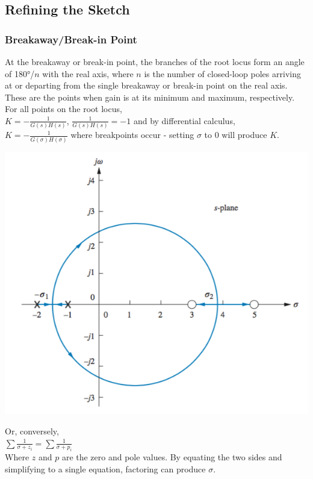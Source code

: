 \documentclass[11pt]{article}
\begin{document}
    \subsection{Refining the Sketch}

    \subsubsection{Breakaway/Break-in Point}

    At the breakaway or break-in point, the branches of the root locus form an angle of 180°/$n$ with the real axis, where $n$ is the number of closed-loop poles arriving at or departing from the single breakaway or break-in point on the real axis. These are the points when gain is at its minimum and maximum, respectively. \\
        
    For all points on the root locus, \\
    
    $K = -\frac{1}{G(s)H(s)}$, $\frac{1}{G(s)H(s)} = -1$ and by differential calculus, \\
    
    $K = -\frac{1}{G(\sigma)H(\sigma)}$ where breakpoints occur - setting $\sigma$ to 0 will produce $K$.

    \begin{center}
        \includegraphics[width=300 px]{img/breakpoints} \\
    \end{center}

    Or, conversely, \\

    $\sum \frac{1}{\sigma + z_i} = \sum \frac{1}{\sigma + p_i}$ \\

    Where $z$ and $p$ are the zero and pole values. By equating the two sides and simplifying to a single equation, factoring can produce $\sigma$.
\end{document}

